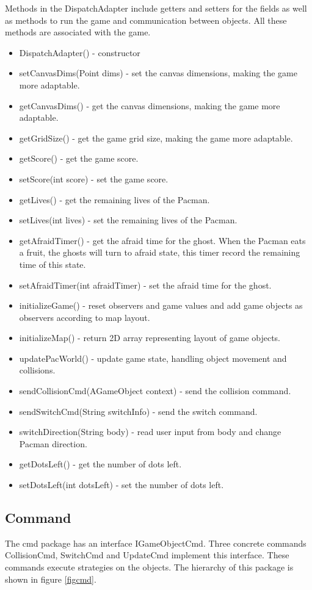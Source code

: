 \documentclass[letterpaper, 11pt]{article}
\begin{document}
Methods in the DispatchAdapter include getters and setters for the fields as well as methods to run the game and communication between objects.  All these methods are associated with the game.
\begin{itemize}
  \item DispatchAdapter() - constructor
  \item setCanvasDims(Point dims) - set the canvas dimensions, making the game more adaptable. 
  \item getCanvasDims() - get the canvas dimensions, making the game more adaptable. 
  \item getGridSize() - get the game grid size, making the game more adaptable. 
  \item getScore() - get the game score.
  \item setScore(int score) - set the game score.
  \item getLives() - get the remaining lives of the Pacman.
  \item setLives(int lives) - set the remaining lives of the Pacman.
  \item getAfraidTimer() - get the afraid time for the ghost. When the Pacman eats a fruit, the ghosts will turn to afraid state, this timer record the remaining time of this state.
  \item setAfraidTimer(int afraidTimer) - set the afraid time for the ghost.
  \item initializeGame() - reset observers and game values and add game objects as observers according to map layout.
  \item initializeMap() - return 2D array representing layout of game objects.
  \item updatePacWorld() - update game state, handling object movement and collisions.
  \item sendCollisionCmd(AGameObject context) - send the collision command.
  \item sendSwitchCmd(String switchInfo) - send the switch command.
  \item switchDirection(String body) - read user input from body and change Pacman direction.
  \item getDotsLeft() - get the number of dots left.
  \item setDotsLeft(int dotsLeft) - set the number of dots left.
 \end{itemize}
 
\subsection{Command}
The cmd package has an interface IGameObjectCmd. Three concrete commands CollisionCmd, SwitchCmd and UpdateCmd implement this interface. These commands execute strategies on the objects. The hierarchy of this package is shown in figure \ref{figcmd}. 
\end{document}
